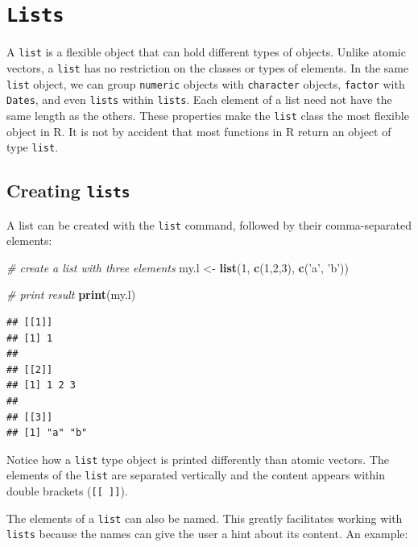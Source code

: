 \documentclass[11pt,]{book}
\newenvironment{Shaded}{\begin{snugshade}}{\end{snugshade}}
\newcommand{\KeywordTok}[1]{\textcolor[rgb]{0.27,0.27,0.27}{\textbf{#1}}}
\newcommand{\DecValTok}[1]{\textcolor[rgb]{0.06,0.06,0.06}{#1}}
\newcommand{\StringTok}[1]{\textcolor[rgb]{0.5,0.5,0.5}{#1}}
\newcommand{\CommentTok}[1]{\textcolor[rgb]{0.56,0.35,0.01}{\textit{#1}}}
\newcommand{\NormalTok}[1]{#1}
\begin{document}
\section{\texorpdfstring{\texttt{Lists}}{Lists}}\label{lists}

A \texttt{list} is a flexible object that can hold different types of
objects. Unlike atomic vectors, a \texttt{list} has no restriction on
the classes or types of elements. In the same \texttt{list} object, we
can group \texttt{numeric} objects with \texttt{character} objects,
\texttt{factor} with \texttt{Dates}, and even \texttt{lists} within
\texttt{lists}. Each element of a list need not have the same length as
the others. These properties make the \texttt{list} class the most
flexible object in R. It is not by accident that most functions in R
return an object of type \texttt{list}. 

\subsection{\texorpdfstring{Creating
\texttt{lists}}{Creating lists}}\label{creating-lists}

A list can be created with the \texttt{list} command, followed by their
comma-separated elements: 

\begin{Shaded}
\begin{Highlighting}[]
\CommentTok{# create a list with three elements}
\NormalTok{my.l <-}\StringTok{ }\KeywordTok{list}\NormalTok{(}\DecValTok{1}\NormalTok{, }\KeywordTok{c}\NormalTok{(}\DecValTok{1}\NormalTok{,}\DecValTok{2}\NormalTok{,}\DecValTok{3}\NormalTok{), }\KeywordTok{c}\NormalTok{(}\StringTok{'a'}\NormalTok{, }\StringTok{'b'}\NormalTok{))}

\CommentTok{# print result}
\KeywordTok{print}\NormalTok{(my.l)}
\end{Highlighting}
\end{Shaded}

\begin{verbatim}
## [[1]]
## [1] 1
## 
## [[2]]
## [1] 1 2 3
## 
## [[3]]
## [1] "a" "b"
\end{verbatim}

Notice how a \texttt{list} type object is printed differently than
atomic vectors. The elements of the \texttt{list} are separated
vertically and the content appears within double brackets
(\texttt{{[}{[}\ {]}{]}}).

The elements of a \texttt{list} can also be named. This greatly
facilitates working with \texttt{lists} because the names can give the
user a hint about its content. An example:
\end{document}
